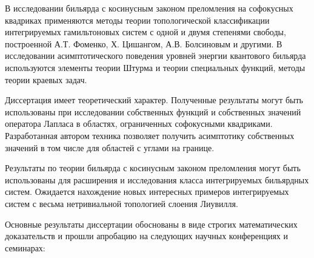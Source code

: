 %
%
{\methods} В исследовании бильярда с косинусным законом преломления на софокусных квадриках применяются методы теории топологической классификации интегрируемых гамильтоновых систем с одной и двумя степенями свободы, построенной А.Т. Фоменко, Х. Цишангом, А.В. Болсиновым и другими. В исследовании асимптотического поведения уровней энергии квантового бильярда используются элементы теории Штурма и теории специальных функций, методы теории краевых задач. 

{\influence} 
Диссертация имеет теоретический характер.
Полученные результаты могут быть использованы при исследовании собственных функций и собственных значений оператора Лапласа в областях, ограниченных софокусными квадриками.
Разработанная автором техника позволяет получить асимптотику собственных значений в том числе для областей с углами на границе.

Результаты по теории бильярда с косинусным законом преломления могут быть использованы для расширения и исследования класса интегрируемых бильярдных систем. Ожидается нахождение новых интересных примеров интегрируемых систем с весьма нетривиальной топологией слоения Лиувилля.


\bigskip
{\probation}
Основные результаты диссертации обоснованы в виде строгих математических доказательств и прошли апробацию на следующих научных конференциях и семинарах:

